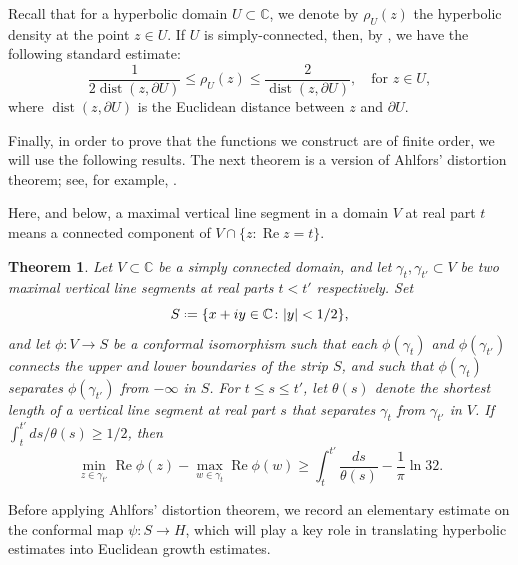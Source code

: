 \documentclass[a4paper, 11pt, reqno]{amsart}
\numberwithin{equation}{section}
\theoremstyle{plain}
\newtheorem{theorem}{Theorem}[section]
\newcommand*{\defeq}{\mathrel{\vcenter{\baselineskip0.5ex \lineskiplimit0pt
 \hbox{\scriptsize.}\hbox{\scriptsize.}}}=}
\theoremstyle{remark}
\newcommand{\C}{{\mathbb{C}}}
\newcommand{\qfor}{\quad\text{for }}
\newcommand{\Rea}{\operatorname{Re }}
\newcommand{\dist}{\operatorname{dist}}
\begin{document}
Recall that for a hyperbolic domain $U \subset \C$, we denote by $\rho_U(z)$ the hyperbolic density at the point $z \in U$. If $U$ is simply-connected, then, by \cite[Theorems~8.2 and 8.6]{beardonandminda}, we have the following standard estimate:
\begin{equation}\label{eq:hypest}
	\frac{1}{2\operatorname{dist}(z, \partial U)} \leq \rho_U(z) \leq \frac{2}{\operatorname{dist}(z, \partial U)}, \qfor z \in U,
\end{equation}
where $\dist(z, \partial U)$ is the Euclidean distance between $z$ and $\partial U$.

Finally, in order to prove that the functions we construct are of finite order, we will use the following results. The next theorem is a version of Ahlfors' distortion theorem; see, for example, \cite[Corollary to Theorem 4.8]{ahlfors}. 

Here, and below, a maximal vertical line segment in a domain \(V\) at real part \(t\) means a connected component of \(V\cap\{z:\Rea z=t\}\).

\begin{theorem}\label{thm_ahlfors}
	Let $V \subset \mathbb{C}$ be a simply connected domain, and
	let $\gamma_t, \gamma_{t'} \subset V$ be two maximal vertical line segments at real parts $t<t'$ respectively. Set 
	\begin{equation}\label{eq_S}
		S \defeq \{ x + iy \in \C \colon |y| < 1/2 \},
	\end{equation}
	and let $\phi \colon V \rightarrow S$ be a conformal isomorphism such that each $\phi(\gamma_t)$
	and $\phi(\gamma_{t'})$ connects the upper and lower
	boundaries of the strip $S$, and such that $\phi(\gamma_t)$ separates $\phi(\gamma_{t'})$ from $-\infty$ in $S$. For $t\leq s \leq t'$, let $\theta(s)$ denote the shortest length of a vertical line segment at real part $s$ that separates $\gamma_t$ from $\gamma_{t'}$ in $V$. If $\int_{t}^{t'}ds/\theta(s) \geq 1/2$, then 
	\begin{equation}
		\min_{z \in \gamma_{t'}} \Rea \phi(z)- \max_{w \in \gamma_{t}} \Rea \phi(w)\geq \int_{t}^{t'}\frac{ds}{\theta(s)}- \frac{1}{\pi}\ln 32.
	\end{equation}
\end{theorem}

Before applying Ahlfors’ distortion theorem, we record an elementary estimate on the conformal map $\psi:S\to H$, which will play a key role in translating hyperbolic estimates into Euclidean growth estimates.
\end{document}
